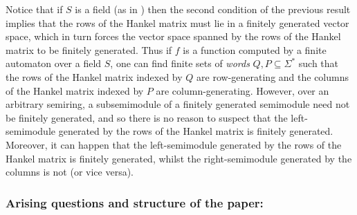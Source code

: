\documentclass{lmcs}
\numberwithin{theorem}{section}
\begin{document}
\begin{rem}
\label{rem:fields1}
Notice that if $S$ is a field (as in \cite{F74}) then the second condition of the previous result implies that the rows of the Hankel matrix must lie in a finitely generated vector space, which in turn forces the vector space spanned by the rows of the Hankel matrix to be finitely generated. Thus if $f$ is a function computed by a finite automaton over a field $S$,  one can find finite sets of \emph{words} $Q,P \subseteq \Sigma^*$ such that the rows of the Hankel matrix indexed by $Q$ are row-generating and the columns of the Hankel matrix indexed by $P$ are column-generating. However, over an arbitrary semiring, a subsemimodule of a finitely generated semimodule need not be finitely generated, and so there is no reason to suspect that the left-semimodule generated by the rows of the Hankel matrix is finitely generated. Moreover, it can happen that the left-semimodule generated by the rows of the Hankel matrix is finitely generated, whilst the right-semimodule generated by the columns is not (or vice versa).
\end{rem}



\subsubsection*{\textbf{Arising questions and structure of the paper:}}
\end{document}

